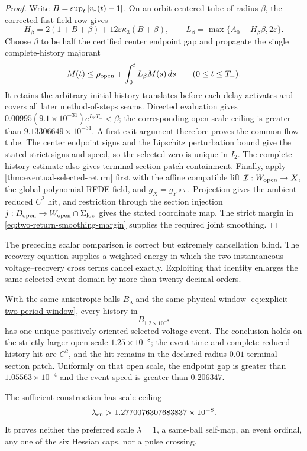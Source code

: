 \begin{proof}
Write \(B=\sup_t\left\lvert v_*(t)-1\right\rvert\).  On an orbit-centered tube of radius
\(\beta\), the corrected fast-field row gives
\[
 H_\beta=2(1+B+\beta)+12\varepsilon\kappa_3(B+\beta),\qquad
 L_\beta=\max\{A_0+H_\beta\beta,2\varepsilon\}.
\]
Choose \(\beta\) to be half the certified center endpoint gap and propagate
the single complete-history majorant
\[
 M(t)\le\rho_{\rm open}+\int_0^tL_\beta M(s)\,ds
 \qquad(0\le t\le T_+).
\]
It retains the arbitrary initial-history translates before each delay
activates and covers all later method-of-steps seams.  Directed evaluation
gives
\(0.00995(9.1\times10^{-31})e^{L_\beta T_+}<\beta\); the corresponding
open-scale ceiling is greater than \(9.13306649\times10^{-31}\).  A first-exit
argument therefore proves the common flow tube.  The center endpoint signs
and the Lipschitz perturbation bound give the stated strict signs and speed,
so the selected zero is unique in \(I_2\).  The complete-history estimate
also gives terminal section-patch containment.  Finally, apply
\cref{thm:eventual-selected-return} first with the affine compatible lift
\(\mathcal I:W_{\rm open}\to X\), the global polynomial RFDE field, and
\(g_X=g_Y\circ\pi\).  Projection gives the ambient reduced \(C^2\) hit, and
restriction through the section injection \(j:D_{\rm open}\to
W_{\rm open}\cap\Sigma_{\rm loc}\) gives the stated coordinate map.  The
strict margin in \cref{eq:two-return-smoothing-margin} supplies the required
joint smoothing.
\end{proof}

The preceding scalar comparison is correct but extremely cancellation blind.
The recovery equation supplies a weighted energy in which the two
instantaneous voltage--recovery cross terms cancel exactly.  Exploiting that
identity enlarges the same selected-event domain by more than twenty decimal
orders.

\begin{proposition}
\label{prop:orbit-aware-two-period-event-tube}
With the same anisotropic balls \(B_\lambda\) and the same physical window
\cref{eq:explicit-two-period-window}, every history in
\begin{equation}
 B_{1.2\times10^{-8}}
\end{equation}
has one unique positively oriented selected voltage event.  The conclusion
holds on the strictly larger open scale \(1.25\times10^{-8}\); the event time
and complete reduced-history hit are \(C^2\), and the hit remains in the
declared radius-\(0.01\) terminal section patch.  Uniformly on that open
scale, the endpoint gap is greater than \(1.05563\times10^{-4}\) and the
event speed is greater than \(0.206347\).

The sufficient construction has scale ceiling
\begin{equation}
 \lambda_{\rm en}>1.2770076307683837\times10^{-8}.
                                                               \label{eq:orbit-aware-lambda-ceiling}
\end{equation}
It proves neither the preferred scale \(\lambda=1\), a same-ball self-map,
an event ordinal, any one of the six Hessian caps, nor a pulse crossing.
\end{proposition}

